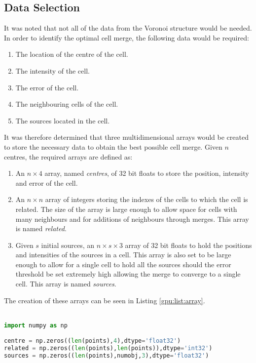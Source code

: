 \subsection{Data Selection}
It was noted that not all of the data from the Voronoi structure would be needed. In order to identify the optimal cell merge, the following data would be required:
\begin{enumerate}
\item The location of the centre of the cell.
\item The intensity of the cell.
\item The error of the cell.
\item The neighbouring cells of the cell.
\item The sources located in the cell.
\end{enumerate}
It was therefore determined that three multidimensional arrays would be created to store the necessary data to obtain the best possible cell merge. Given $n$ centres, the required arrays are defined as:
\begin{enumerate}
\item An $n \times 4$ array, named \textit{centres}, of 32 bit floats to store the position, intensity and error of the cell.
\item An $n \times n$ array of integers storing the indexes of the cells to which the cell is related. The size of the array is large enough to allow space for cells with many neighbours and for additions of neighbours through merges. This array is named \textit{related}.
\item Given $s$ initial sources, an $n \times s \times 3$ array of 32 bit floats to hold the positions and intensities of the sources in a cell. This array is also set to be large enough to allow for a single cell to hold all the sources should the error threshold be set extremely high allowing the merge to converge to a single cell. This array is named \textit{sources}.
\end{enumerate}
The creation of these arrays can be seen in Listing \ref{gpu:list:array}.
\\
\\
\begin{lstlisting}[language=Python, label=gpu:list:array]
import numpy as np

centre = np.zeros((len(points),4),dtype='float32')
related = np.zeros((len(points),len(points)),dtype='int32')
sources = np.zeros((len(points),numobj,3),dtype='float32')
\end{lstlisting}

